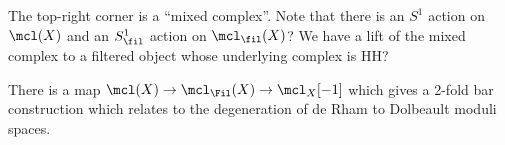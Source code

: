 \begin{remark}

The top-right corner is a ``mixed complex''. Note that there is an
\(S^1\) action on \(\mcl(X)\) and an \(S^1_\fil\) action on
\(\mcl_\fil(X)\)? We have a lift of the mixed complex to a filtered
object whose underlying complex is HH?

\end{remark}

\begin{remark}

There is a map \(\mcl(X) \to \mcl_\Fil(X)\to \mcl_X[-1]\) which gives a
2-fold bar construction which relates to the degeneration of de Rham to
Dolbeault moduli spaces.

\end{remark}





